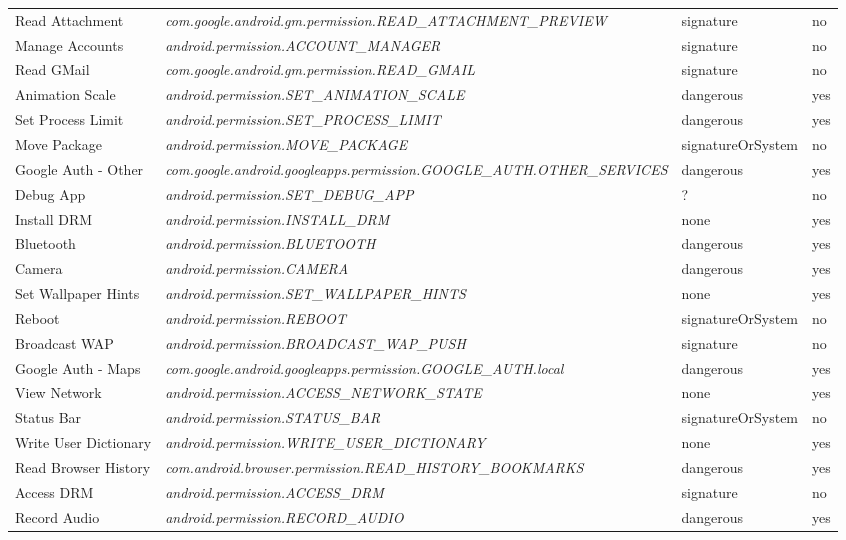 \begin{small}
\begin{longtable}{p{3cm}|p{8cm}|p{2.5cm}|p{1.5cm}}
Read Attachment & \textit{com.google.android.gm.permission.\-READ\_ATTACHMENT\_PREVIEW} & signature & no \\
Manage Accounts & \textit{android.permission.\-ACCOUNT\_MANAGER} & signature & no \\
Read GMail & \textit{com.google.android.gm.permission.\-READ\_GMAIL} & signature & no \\
Animation Scale & \textit{android.permission.\-SET\_ANIMATION\_SCALE} & dangerous & yes \\
Set Process Limit & \textit{android.permission.\-SET\_PROCESS\_LIMIT} & dangerous & yes \\
Move Package & \textit{android.permission.\-MOVE\_PACKAGE} & signatureOrSystem & no \\
Google Auth - Other & \textit{com.google.android.googleapps.permission.\-GOOGLE\_AUTH.OTHER\_SERVICES} & dangerous & yes \\
Debug App & \textit{android.permission.\-SET\_DEBUG\_APP} & ? & no \\
Install DRM & \textit{android.permission.\-INSTALL\_DRM} & none & yes \\
Bluetooth & \textit{android.permission.\-BLUETOOTH} & dangerous & yes \\
Camera & \textit{android.permission.\-CAMERA} & dangerous & yes \\
Set Wallpaper Hints & \textit{android.permission.\-SET\_WALLPAPER\_HINTS} & none & yes \\
Reboot & \textit{android.permission.\-REBOOT} & signatureOrSystem & no \\
Broadcast WAP & \textit{android.permission.\-BROADCAST\_WAP\_PUSH} & signature & no \\
Google Auth - Maps & \textit{com.google.android.googleapps.permission.\-GOOGLE\_AUTH.local} & dangerous & yes \\
View Network & \textit{android.permission.\-ACCESS\_NETWORK\_STATE} & none & yes \\
Status Bar & \textit{android.permission.\-STATUS\_BAR} & signatureOrSystem & no \\
Write User Dictionary & \textit{android.permission.\-WRITE\_USER\_DICTIONARY} & none & yes \\
Read Browser History & \textit{com.android.browser.permission.\-READ\_HISTORY\_BOOKMARKS} & dangerous & yes \\
Access DRM & \textit{android.permission.\-ACCESS\_DRM} & signature & no \\
Record Audio & \textit{android.permission.\-RECORD\_AUDIO} & dangerous & yes \\

\end{longtable}
\end{small}
